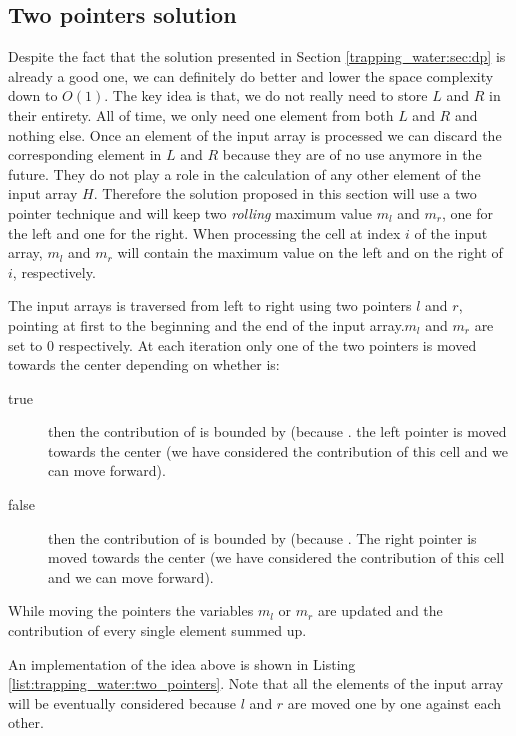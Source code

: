 \subsection{Two pointers solution}
\label{trapping_water:sec:two_pointers}
Despite the fact that the solution presented in Section \ref{trapping_water:sec:dp} is already a good one, we can definitely do better and lower the space complexity down to $O(1)$. The key idea is that, we do not really need to store $L$ and $R$ in their entirety. All of time, we only need one element from both $L$ and $R$ and nothing else. Once an element of the input array is processed we can discard the corresponding element in $L$ and $R$ because they are of no use anymore in the future. They do not play a role in the calculation of any other element of the input array $H$. Therefore the solution proposed in this section will use a two pointer technique and will keep two \textit{rolling} maximum value $m_l$ and $m_r$, one for the left and one for the right. When processing the cell at index $i$ of the input array, $m_l$ and $m_r$ will contain the maximum value on the left  and on the right of $i$, respectively.

The input arrays is traversed from left to right using two pointers $l$ and $r$, pointing at first to the beginning and the end of the input array.$m_l$ and $m_r$ are set to $0$ respectively. At each iteration only one of the two pointers is moved towards the center depending on whether  is:
\begin{description}
\item[true]  then the contribution of  is bounded by  (because . the left pointer is moved towards the center (we have considered the contribution of this cell and we can move forward).\\
\item[false] then the contribution of  is bounded by  (because . The right pointer is moved towards the center (we have considered the contribution of this cell and we can move forward). \\
\end{description}

While moving the pointers the variables $m_l$ or $m_r$ are updated and the contribution of every single element summed up.

An implementation of the idea above is shown in Listing \ref{list:trapping_water:two_pointers}. Note that all the elements of the input array will be eventually considered because $l$ and $r$ are moved one by one against each other. 

